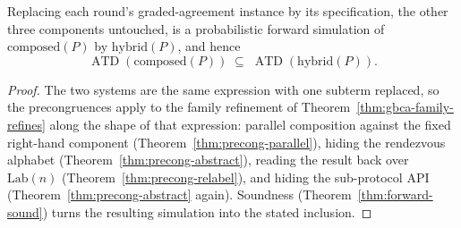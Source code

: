 \begin{theorem}[Substitution]
  \label{thm:aba-substitution}
  \leanok
  Replacing each round's graded-agreement instance by its specification, the other three components untouched, is a probabilistic forward simulation of $\mathrm{composed}(P)$ by $\mathrm{hybrid}(P)$, and hence
  \[
    \operatorname{ATD}(\mathrm{composed}(P)) \;\subseteq\;
    \operatorname{ATD}(\mathrm{hybrid}(P)).
  \]
\end{theorem}

\begin{proof}\leanok
  The two systems are the same expression with one subterm replaced, so the precongruences apply to the family refinement of Theorem~\ref{thm:gbca-family-refines} along the shape of that expression: parallel composition against the fixed right-hand component (Theorem~\ref{thm:precong-parallel}), hiding the rendezvous alphabet (Theorem~\ref{thm:precong-abstract}), reading the result back over $\mathrm{Lab}(n)$ (Theorem~\ref{thm:precong-relabel}), and hiding the sub-protocol API (Theorem~\ref{thm:precong-abstract} again).
  Soundness (Theorem~\ref{thm:forward-sound}) turns the resulting simulation into the stated inclusion.
\end{proof}
